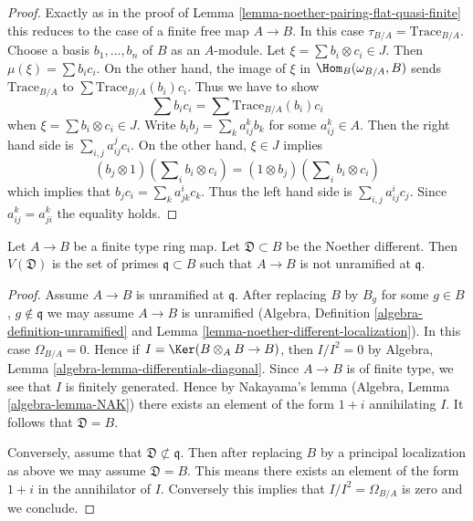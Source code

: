 \begin{proof}
Exactly as in the proof of Lemma \ref{lemma-noether-pairing-flat-quasi-finite}
this reduces to the case of a finite free map $A \to B$.
In this case $\tau_{B/A} = \text{Trace}_{B/A}$.
Choose a basis $b_1, \ldots, b_n$ of $B$ as an $A$-module.
Let $\xi = \sum b_i \otimes c_i \in J$. Then $\mu(\xi) = \sum b_i c_i$.
On the other hand, the image of $\xi$ in $\Hom_B(\omega_{B/A}, B)$
sends $\text{Trace}_{B/A}$ to $\sum \text{Trace}_{B/A}(b_i)c_i$.
Thus we have to show
$$
\sum b_ic_i = \sum \text{Trace}_{B/A}(b_i)c_i
$$
when $\xi = \sum b_i \otimes c_i \in J$. Write $b_i b_j = \sum_k a_{ij}^k b_k$
for some $a_{ij}^k \in A$. Then the right hand side is
$\sum_{i, j} a_{ij}^j c_i$. On the other hand, $\xi \in J$ implies
$$
(b_j \otimes 1)(\sum\nolimits_i b_i \otimes c_i) =
(1 \otimes b_j)(\sum\nolimits_i b_i \otimes c_i)
$$
which implies that $b_j c_i = \sum_k a_{jk}^i c_k$. Thus the left hand side
is $\sum_{i, j} a_{ij}^i c_j$. Since $a_{ij}^k = a_{ji}^k$ the equality holds.
\end{proof}

\begin{lemma}
\label{lemma-noether-different}
Let $A \to B$ be a finite type ring map. Let $\mathfrak{D} \subset B$
be the Noether different. Then $V(\mathfrak{D})$ is the set of primes
$\mathfrak q \subset B$ such that $A \to B$ is not unramified at $\mathfrak q$.
\end{lemma}

\begin{proof}
Assume $A \to B$ is unramified at $\mathfrak q$. After replacing
$B$ by $B_g$ for some $g \in B$, $g \not \in \mathfrak q$ we may
assume $A \to B$ is unramified (Algebra, Definition
\ref{algebra-definition-unramified} and
Lemma \ref{lemma-noether-different-localization}).
In this case $\Omega_{B/A} = 0$. Hence if $I = \Ker(B \otimes_A B \to B)$,
then $I/I^2 = 0$ by
Algebra, Lemma \ref{algebra-lemma-differentials-diagonal}.
Since $A \to B$ is of finite type, we see that $I$ is finitely
generated. Hence by Nakayama's lemma
(Algebra, Lemma \ref{algebra-lemma-NAK})
there exists an element of the form $1 + i$
annihilating $I$. It follows that $\mathfrak{D} = B$.

\medskip\noindent
Conversely, assume that $\mathfrak{D} \not \subset \mathfrak q$.
Then after replacing $B$ by a principal localization as above
we may assume $\mathfrak{D} = B$. This means there exists an
element of the form $1 + i$ in the annihilator of $I$.
Conversely this implies that $I/I^2 = \Omega_{B/A}$ is zero
and we conclude.
\end{proof}







